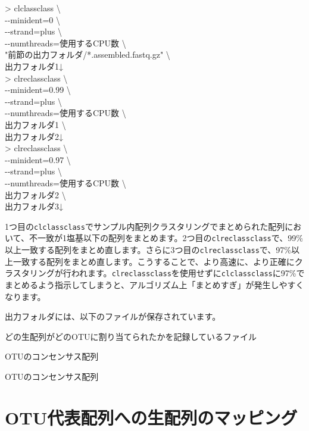 \documentclass[titlepage,10pt,a4paper]{jsbook}
\newenvironment{cmd}{\begin{oframed}\raggedright\ttfamily\footnotesize\setlength{\baselineskip}{1.4em}}{\end{oframed}\vspace{-1em}}
\begin{document}
\begin{cmd}
{\textgreater} clclassclass {\textbackslash}\\
{-}{-}minident=0 {\textbackslash}\\
{-}{-}strand=plus {\textbackslash}\\
{-}{-}numthreads=使用するCPU数 {\textbackslash}\\
"前節の出力フォルダ/*.assembled.fastq.gz" {\textbackslash}\\
出力フォルダ1↓\\
{\textgreater} clreclassclass {\textbackslash}\\
{-}{-}minident=0.99 {\textbackslash}\\
{-}{-}strand=plus {\textbackslash}\\
{-}{-}numthreads=使用するCPU数 {\textbackslash}\\
出力フォルダ1 {\textbackslash}\\
出力フォルダ2↓\\
{\textgreater} clreclassclass {\textbackslash}\\
{-}{-}minident=0.97 {\textbackslash}\\
{-}{-}strand=plus {\textbackslash}\\
{-}{-}numthreads=使用するCPU数 {\textbackslash}\\
出力フォルダ2 {\textbackslash}\\
出力フォルダ3↓
\end{cmd}
1つ目の\texttt{clclassclass}でサンプル内配列クラスタリングでまとめられた配列において、不一致が1塩基以下の配列をまとめます。2つ目の\texttt{clreclassclass}で、99\%以上一致する配列をまとめ直します。さらに3つ目の\texttt{clreclassclass}で、97\%以上一致する配列をまとめ直します。こうすることで、より高速に、より正確にクラスタリングが行われます。\texttt{clreclassclass}を使用せずに\texttt{clclassclass}に97\%でまとめるよう指示してしまうと、アルゴリズム上「まとめすぎ」が発生しやすくなります。

出力フォルダには、以下のファイルが保存されています。
\begin{description}\small\setlength{\baselineskip}{1.1em}
\item[assembled.contigmembers.gz] どの生配列がどのOTUに割り当てられたかを記録しているファイル
\item[assembled.fastq.gz] OTUのコンセンサス配列
\item[assembled.fasta] OTUのコンセンサス配列
\end{description}

\section{OTU代表配列への生配列のマッピング}
\end{document}
